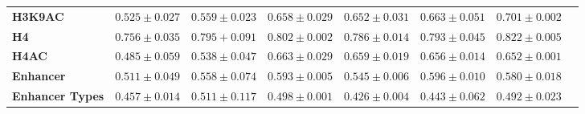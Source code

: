 \begin{table*}
{\begin{tabular}{@{}lccccccc@{}}
\textbf{H3K9AC}           &           $ 0.525 \pm0.027$           &           $0.559 \pm0.023$            &          $0.658\pm 0.029$              &         $0.652\pm 0.031$              &        $0.663\pm 0.051$               &         $ 0.701 \pm 0.002$            \\
\textbf{H4}               &            $0.756 \pm0.035$          &         $0.795+ 0.091$              &             $0.802\pm 0.002$           &            $0.786\pm 0.014$           &         $0.793\pm 0.045$              &         $ 0.822 \pm 0.005$             \\
\textbf{H4AC}             &            $0.485\pm 0.059$          &         $0.538 \pm  0.047$              &         $0.663\pm 0.029$               &        $0.659\pm 0.019$               &      $0.656\pm 0.014$                 &          $  0.652 \pm 0.001$          \\
\textbf{Enhancer }        &          $0.511 \pm 0.049$            &           $0.558 \pm 0.074 $            &        $0.593\pm 0.005$                &        $0.545\pm 0.006$               &     $0.596\pm 0.010$                  &           $ 0.580 \pm 0.018$         \\
\textbf{Enhancer Types}   &          $0.457\pm0.014$            &             $0.511\pm0.117$          &             $0.498\pm 0.001$           &           $0.426\pm 0.004$            &        $0.443\pm 0.062$               &           $0.492   \pm 0.023$        \\


\end{tabular}}
\end{table*}

